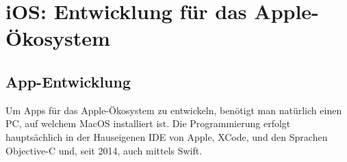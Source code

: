 \section{iOS: Entwicklung für das Apple-Ökosystem}
\label{iosdev}

\subsection{App-Entwicklung}
Um Apps für das Apple-Ökosystem zu entwickeln, benötigt man natürlich einen PC, auf welchem MacOS
installiert ist. Die Programmierung erfolgt hauptsächlich in der Hauseigenen IDE von Apple, XCode,
und den Sprachen Objective-C und, seit 2014, auch mittels Swift.